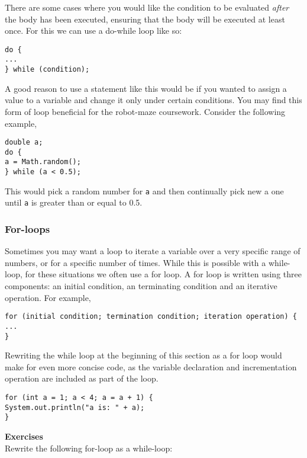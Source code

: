 \noindent
There are some cases where you would like the condition to be evaluated \emph{after} the body has been executed, ensuring that the body will be executed at least once. For this we can use a do-while loop like so:

\begin{verbatim}
do {
...
} while (condition);
\end{verbatim}

\noindent
A good reason to use a statement like this would be if you wanted to assign a value to a variable and change it only under certain conditions. You may find this form of loop beneficial for the robot-maze coursework. Consider the following example,

\begin{verbatim}
double a;
do {
a = Math.random();
} while (a < 0.5);
\end{verbatim}

\noindent
This would pick a random number for {\tt a} and then continually pick new a one until {\tt a} is greater than or equal to 0.5.

\subsubsection*{For-loops}

Sometimes you may want a loop to iterate a variable over a very specific range of numbers, or for a specific number of times. While this is possible with a while-loop, for these situations we often use a for loop. A for loop is written using three components: an initial condition, an terminating condition and an iterative operation. For example,

\begin{verbatim}
for (initial condition; termination condition; iteration operation) {
...
}
\end{verbatim}

\noindent
Rewriting the while loop at the beginning of this section as a for loop would make for even more concise code, as the variable declaration and incrementation operation are included as part of the loop.

\begin{verbatim}
for (int a = 1; a < 4; a = a + 1) {
System.out.println("a is: " + a);
}
\end{verbatim}

\noindent
{\bf Exercises} \\

\noindent
Rewrite the following for-loop as a while-loop:

